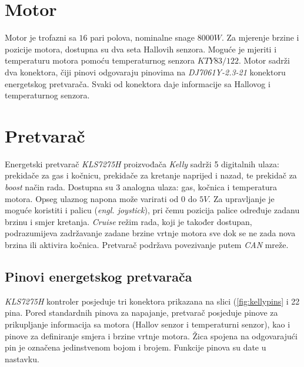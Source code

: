 \section{Motor}

\qquad Motor je trofazni sa $16$ pari polova, nominalne snage $8000W$. Za mjerenje brzine i pozicije motora, dostupna su dva seta Hallovih senzora. Moguće je mjeriti i temperaturu motora pomoću temperaturnog senzora $KTY83/122$. Motor sadrži dva konektora, čiji pinovi odgovaraju pinovima na \textit{DJ7061Y-2.3-21} konektoru energetskog pretvarača. Svaki od konektora daje informacije sa Hallovog i temperaturnog senzora.

\section{Pretvarač}

\qquad Energetski pretvarač \textit{KLS7275H} proizvođača \textit{Kelly} sadrži 5 digitalnih ulaza: prekidače za gas i kočnicu, prekidače za kretanje naprijed i nazad, te prekidač za \textit{boost} način rada. Dostupna su 3 analogna ulaza: gas, kočnica i temperatura motora. Opseg ulaznog napona može varirati od $0$ do $5V$. Za upravljanje je moguće koristiti i palicu (\textit{engl. joystick}), pri čemu pozicija palice određuje zadanu brzinu i smjer kretanja. \textit{Cruise} režim rada, koji je također dostupan, podrazumijeva zadržavanje zadane brzine vrtnje motora sve dok se ne zada nova brzina ili aktivira kočnica. Pretvarač podržava povezivanje putem \textit{CAN} mreže.

\subsection{Pinovi energetskog pretvarača}

\qquad \textit{KLS7275H} kontroler posjeduje tri konektora prikazana na slici (\ref{fig:kellypins} i 22 pina. Pored standardnih pinova za napajanje, pretvarač posjeduje pinove za prikupljanje informacija sa motora (Hallov senzor i temperaturni senzor), kao i pinove za definiranje smjera i brzine vrtnje motora. Žica spojena na odgovarajući pin je označena jedinstvenom bojom i brojem. Funkcije pinova su date u nastavku.

